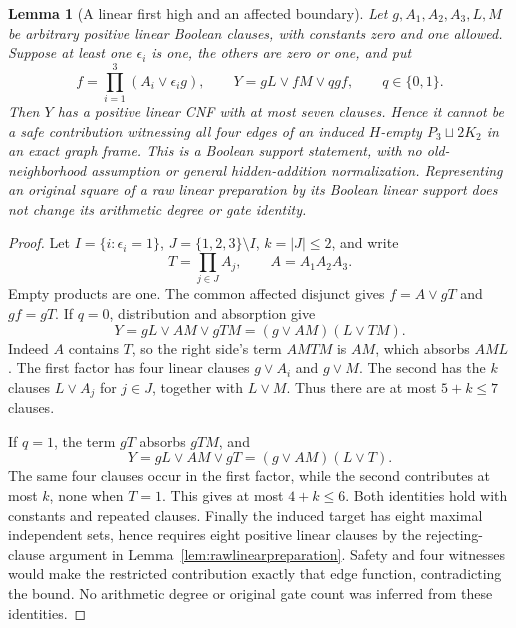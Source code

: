 \documentclass[11pt]{article}
\newtheorem{lemma}[theorem]{Lemma}
\theoremstyle{definition}
\theoremstyle{remark}
\begin{document}
\begin{lemma}[A linear first high and an affected boundary]\label{lem:linearfirstaffected}
Let $g,A_1,A_2,A_3,L,M$ be arbitrary positive linear Boolean clauses, with constants zero and one allowed. Suppose at least one $\epsilon_i$ is one, the others are zero or one, and put
\[
 f=\prod_{i=1}^3(A_i\vee\epsilon_i g),\qquad
 Y=gL\vee fM\vee qgf,\qquad q\in\{0,1\}.
\]
Then $Y$ has a positive linear CNF with at most seven clauses. Hence it cannot be a safe contribution witnessing all four edges of an induced $H$-empty $P_3\sqcup2K_2$ in an exact graph frame. This is a Boolean support statement, with no old-neighborhood assumption or general hidden-addition normalization. Representing an original square of a raw linear preparation by its Boolean linear support does not change its arithmetic degree or gate identity.
\end{lemma}
\begin{proof}
Let $I=\{i:\epsilon_i=1\}$, $J=\{1,2,3\}\setminus I$, $k=|J|\le2$, and write
\[
 T=\prod_{j\in J}A_j,\qquad A=A_1A_2A_3.
\]
Empty products are one. The common affected disjunct gives $f=A\vee gT$ and $gf=gT$. If $q=0$, distribution and absorption give
\[
 Y=gL\vee AM\vee gTM=(g\vee AM)(L\vee TM).
\]
Indeed $A$ contains $T$, so the right side's term $AMTM$ is $AM$, which absorbs $AML$. The first factor has four linear clauses $g\vee A_i$ and $g\vee M$. The second has the $k$ clauses $L\vee A_j$ for $j\in J$, together with $L\vee M$. Thus there are at most $5+k\le7$ clauses.

If $q=1$, the term $gT$ absorbs $gTM$, and
\[
 Y=gL\vee AM\vee gT=(g\vee AM)(L\vee T).
\]
The same four clauses occur in the first factor, while the second contributes at most $k$, none when $T=1$. This gives at most $4+k\le6$. Both identities hold with constants and repeated clauses. Finally the induced target has eight maximal independent sets, hence requires eight positive linear clauses by the rejecting-clause argument in Lemma~\ref{lem:rawlinearpreparation}. Safety and four witnesses would make the restricted contribution exactly that edge function, contradicting the bound. No arithmetic degree or original gate count was inferred from these identities.
\end{proof}
\end{document}
